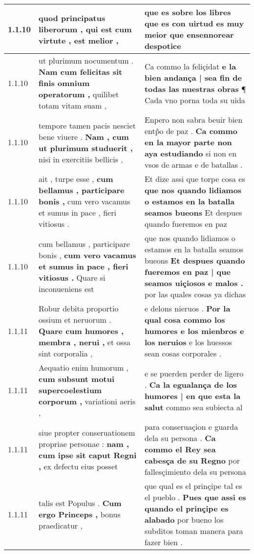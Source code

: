 \begin{tabular}{|p{1cm}|p{6.5cm}|p{6.5cm}|}
1.1.10 & quod principatus liberorum , \textbf{ qui est cum virtute , } est melior , & que es sobre los libres \textbf{ que es con uirtud es muy meior } que ensennorear despotice \\\hline
1.1.10 & ut plurimum nocumentum . \textbf{ Nam cum felicitas sit finis omnium operatorum , } quilibet totam vitam suam , & Ca commo la feliçidat \textbf{ e la bien andança | sea fin de todas las nuestras obras } ¶ Cada vno porna toda su uida \\\hline
1.1.10 & tempore tamen pacis nesciet bene viuere . \textbf{ Nam , cum ut plurimum studuerit , } nisi in exercitiis bellicis , & Enpero non sabra beuir bien entp̃o de paz . \textbf{ Ca commo en la mayor parte non aya estudiando } si non en vsos de armas e de batallas . \\\hline
1.1.10 & ait , turpe esse , \textbf{ cum bellamus , participare bonis , } cum vero vacamus et sumus in pace , fieri vitiosus . & Et dize assi que torpe cosa es \textbf{ que nos quando lidiamos o estamos en la batalla seamos bueons } Et despues quando fueremos en paz \\\hline
1.1.10 & cum bellamus , participare bonis , \textbf{ cum vero vacamus et sumus in pace , fieri vitiosus . } Quare si inconueniens est & que nos quando lidiamos o estamos en la batalla seamos bueons \textbf{ Et despues quando fueremos en paz | que seamos uiçiosos e malos . } por las quales cosas ya dichas \\\hline
1.1.11 & Robur debita proportio ossium et neruorum . \textbf{ Quare cum humores , membra , nerui , } et ossa sint corporalia , & e delons nieruos . \textbf{ Por la qual cosa commo los humores e los mienbros e los neruios } e los huessos sean cosas corporales . \\\hline
1.1.11 & Aequatio enim humorum , \textbf{ cum subsunt motui supercoelestium corporum , } variationi aeris , & e se puerden perder de ligero . \textbf{ Ca la egualança de los humores | en que esta la salut } commo sea subiecta al \\\hline
1.1.11 & siue propter conseruationem propriae personae : \textbf{ nam , cum ipse sit caput Regni , } ex defectu eius posset & para conseruaçion e guarda dela su persona . \textbf{ Ca commo el Rey sea cabesça de su Regno } por fallesçimiento dela su persona \\\hline
1.1.11 & talis est Populus . \textbf{ Cum ergo Princeps , } bonus praedicatur , & que qual es el prinçipe tal es el pueblo . \textbf{ Pues que assi es quando el prinçipe es alabado } por bueno los subditos toman manera para fazer bien . \\\hline

\end{tabular}
